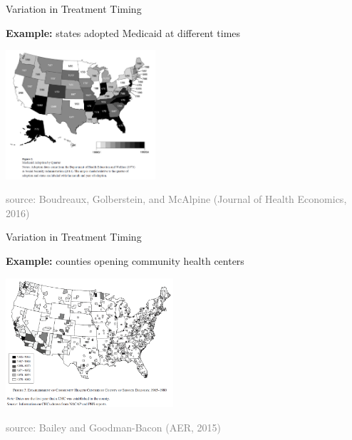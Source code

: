 \documentclass[10pt,xcolor=table,ignorenonframetext,handout,aspectratio=169]{beamer}
\begin{document}
\newpage
\begin{frame}{Variation in Treatment Timing}

\medskip

\begin{center}

\textbf{Example:}  states adopted Medicaid at different times

\medskip	
\medskip

\includegraphics[height=4.8cm]{img/BoudreauxEtAl-map.png} 

\smallskip

\tiny{\textcolor{gray}{source:  Boudreaux, Golberstein, and McAlpine (Journal of Health Economics, 2016)}}
\end{center}



\end{frame}



\newpage
\begin{frame}{Variation in Treatment Timing}

\medskip

\begin{center}

\textbf{Example:}  counties opening community health centers

\medskip
\medskip

\includegraphics[height=4.8cm]{img/BaileyGoodmanBacon-map.png} 

\smallskip

\tiny{\textcolor{gray}{source:  Bailey and Goodman-Bacon (AER, 2015)}}
\end{center}

\end{frame}
\end{document}
